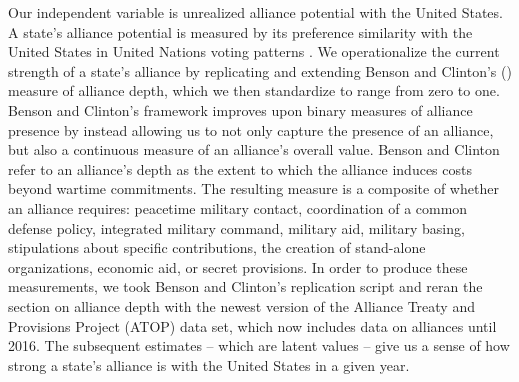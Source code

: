 \documentclass[12pt,letterpaper]{article}
\begin{document}
		Our independent variable is unrealized alliance potential with the United States. A state's alliance potential is measured by its preference similarity with the United States in United Nations voting patterns \citep{gartzke_preferencesdemocraticpeace_2000}. We operationalize the current strength of a state's alliance by replicating and extending Benson and Clinton's (\citeyear{benson_assessingvariationformal_2016}) measure of alliance depth, which we then standardize to range from zero to one. Benson and Clinton's framework improves upon binary measures of alliance presence by instead allowing us to not only capture the presence of an alliance, but also a continuous measure of an alliance's overall value. 
		Benson and Clinton refer to an alliance's depth as the extent to which the alliance induces costs beyond wartime commitments. 
		The resulting measure is a composite of whether an alliance requires: peacetime military contact, coordination of a common defense policy, integrated military command, military aid, military basing, stipulations about specific contributions, the creation of stand-alone organizations, economic aid, or secret provisions.
		In order to produce these measurements, we took Benson and Clinton's replication script and reran the section on alliance depth with the newest version of the Alliance Treaty and Provisions Project (ATOP) data set, which now includes data on alliances until 2016. \citep{leeds_alliancetreatyobligations_2002} The subsequent estimates -- which are latent values -- give us a sense of how strong a state's alliance is with the United States in a given year.
\end{document}
